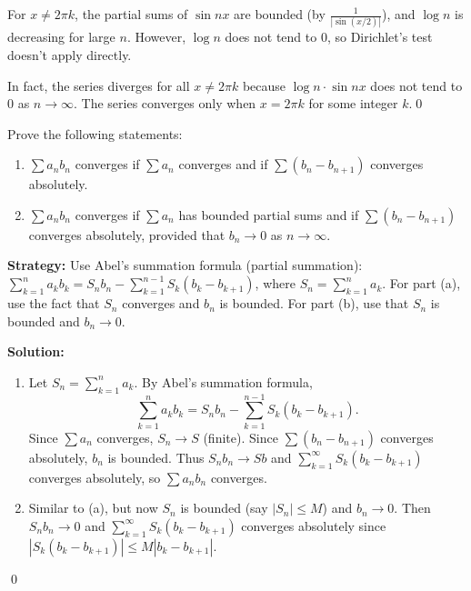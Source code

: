 For \(x \neq 2\pi k\), the partial sums of \(\sin nx\) are bounded (by \(\frac{1}{|\sin(x/2)|}\)), and \(\log n\) is decreasing for large \(n\). However, \(\log n\) does not tend to 0, so Dirichlet's test doesn't apply directly.

In fact, the series diverges for all \(x \neq 2\pi k\) because \(\log n \cdot \sin nx\) does not tend to 0 as \(n \to \infty\). The series converges only when \(x = 2\pi k\) for some integer \(k\).\qed



\begin{problembox}
Prove the following statements:
\begin{enumerate}[label=\alph*)]
\item \(\sum a_n b_n\) converges if \(\sum a_n\) converges and if \(\sum (b_n - b_{n+1})\) converges absolutely.
\item \(\sum a_n b_n\) converges if \(\sum a_n\) has bounded partial sums and if \(\sum (b_n - b_{n+1})\) converges absolutely, provided that \(b_n \to 0\) as \(n \to \infty\).
\end{enumerate}
\end{problembox}

\noindent\textbf{Strategy:} Use Abel's summation formula (partial summation): \(\sum_{k=1}^n a_k b_k = S_n b_n - \sum_{k=1}^{n-1} S_k(b_k - b_{k+1})\), where \(S_n = \sum_{k=1}^n a_k\). For part (a), use the fact that \(S_n\) converges and \(b_n\) is bounded. For part (b), use that \(S_n\) is bounded and \(b_n \to 0\).

\bigskip\noindent\textbf{Solution:}
\begin{enumerate}[label=(\alph*)]
\item Let \(S_n = \sum_{k=1}^n a_k\). By Abel's summation formula,
\[\sum_{k=1}^n a_k b_k = S_n b_n - \sum_{k=1}^{n-1} S_k(b_k - b_{k+1}).\]
Since \(\sum a_n\) converges, \(S_n \to S\) (finite). Since \(\sum (b_n - b_{n+1})\) converges absolutely, \(b_n\) is bounded. Thus \(S_n b_n \to S b\) and \(\sum_{k=1}^{\infty} S_k(b_k - b_{k+1})\) converges absolutely, so \(\sum a_n b_n\) converges.

\item Similar to (a), but now \(S_n\) is bounded (say \(|S_n| \leq M\)) and \(b_n \to 0\). Then \(S_n b_n \to 0\) and \(\sum_{k=1}^{\infty} S_k(b_k - b_{k+1})\) converges absolutely since \(|S_k(b_k - b_{k+1})| \leq M|b_k - b_{k+1}|\).
\end{enumerate}\qed

